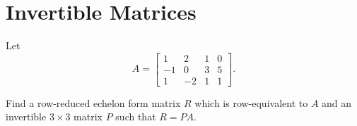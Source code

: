 \section{Invertible Matrices}

\setcounter{exercise}{0}

\begin{exercise}
    Let
    \[
        A = \begin{bmatrix}
            1  & 2  & 1 & 0 \\
            -1 & 0  & 3 & 5 \\
            1  & -2 & 1 & 1
        \end{bmatrix}.
    \]

    Find a row-reduced echelon form matrix $R$ which is row-equivalent to $A$ and an invertible $3\times 3$ matrix $P$ such that $R = PA$.
\end{exercise}

